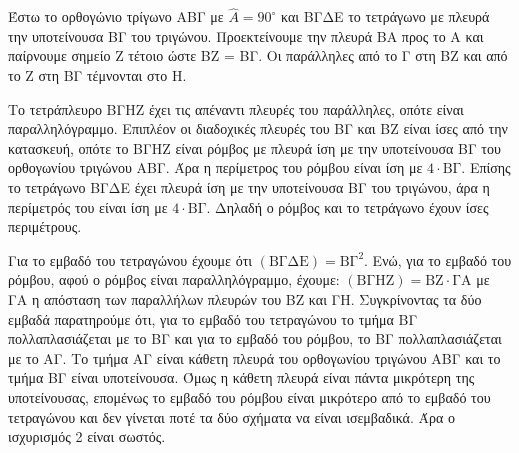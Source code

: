 \noindent Έστω το ορθογώνιο τρίγωνο \mbox{ΑΒΓ} με $\hat{A} =90^{\circ}$ και \mbox{ΒΓΔΕ} το τετράγωνο με πλευρά την υποτείνουσα \mbox{ΒΓ} του τριγώνου. Προεκτείνουμε την πλευρά \mbox{ΒΑ} προς το \mbox{Α} και παίρνουμε σημείο \mbox{Ζ} τέτοιο ώστε \mbox{ΒΖ} = \mbox{ΒΓ}. Οι παράλληλες από το \mbox{Γ} στη \mbox{ΒΖ} και από το \mbox{Ζ} στη \mbox{ΒΓ} τέμνονται στο \mbox{Η}.

\begin{alist}
    \item Το τετράπλευρο \mbox{ΒΓΗΖ} έχει τις απέναντι πλευρές του παράλληλες, οπότε είναι παραλληλόγραμμο. Επιπλέον οι διαδοχικές πλευρές του \mbox{ΒΓ} και \mbox{ΒΖ} είναι ίσες από την κατασκευή, οπότε το \mbox{ΒΓΗΖ} είναι ρόμβος με πλευρά ίση με την υποτείνουσα \mbox{ΒΓ} του ορθογωνίου τριγώνου \mbox{ΑΒΓ}. Άρα η περίμετρος του ρόμβου είναι ίση με $4 \cdot \text{ΒΓ}$. Επίσης το τετράγωνο \mbox{ΒΓΔΕ} έχει πλευρά ίση με την υποτείνουσα \mbox{ΒΓ} του τριγώνου, άρα η περίμετρός του είναι ίση με $4 \cdot \text{ΒΓ}$. Δηλαδή ο ρόμβος και το τετράγωνο έχουν ίσες περιμέτρους.
    \item Για το εμβαδό του τετραγώνου έχουμε ότι $(\text{ΒΓΔΕ}) = \text{ΒΓ}^2$. Ενώ, για το εμβαδό του ρόμβου, αφού ο ρόμβος είναι παραλληλόγραμμο, έχουμε: $(\text{ΒΓΗΖ}) = \text{ΒΖ} \cdot \text{ΓΑ}$ με \mbox{ΓΑ} η απόσταση των παραλλήλων πλευρών του \mbox{ΒΖ} και \mbox{ΓΗ}. Συγκρίνοντας τα δύο εμβαδά παρατηρούμε ότι, για το εμβαδό του τετραγώνου το τμήμα \mbox{ΒΓ} πολλαπλασιάζεται με το \mbox{ΒΓ} και για το εμβαδό του ρόμβου, το \mbox{ΒΓ} πολλαπλασιάζεται με το \mbox{ΑΓ}. Το τμήμα \mbox{ΑΓ} είναι κάθετη πλευρά του ορθογωνίου τριγώνου \mbox{ΑΒΓ} και το τμήμα \mbox{ΒΓ} είναι υποτείνουσα. Όμως η κάθετη πλευρά είναι πάντα μικρότερη της υποτείνουσας, επομένως το εμβαδό του ρόμβου είναι μικρότερο από το εμβαδό του τετραγώνου και δεν γίνεται ποτέ τα δύο σχήματα να είναι ισεμβαδικά. Άρα ο ισχυρισμός 2 είναι σωστός.
\end{alist}